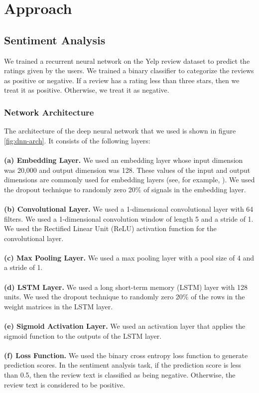 \section{Approach}

\subsection{Sentiment Analysis}

We trained a recurrent neural network on the Yelp review dataset to predict the ratings given by the users. We trained a binary classifier to categorize the reviews as positive or negative. If a review has a rating less than three stars, then we treat it as positive. Otherwise, we treat it as negative.

\subsubsection{Network Architecture}

The architecture of the deep neural network that we used is shown in figure \ref{fig:dnn-arch}. It consists of the following layers:
\\ \\
\textbf{(a) Embedding Layer.} We used an embedding layer whose input dimension was 20,000 and output dimension was 128. These values of the input and output dimensions are commonly used for embedding layers (see, for example, \cite{Lu2017}). We used the dropout technique \cite{ZarembaSV2014} to randomly zero 20\% of signals in the embedding layer.
\\ \\
\textbf{(b) Convolutional Layer.} We used a 1-dimensional convolutional layer with 64 filters. We used a 1-dimensional convolution window of length 5 and a stride of 1. We used the Rectified Linear Unit (ReLU) activation function for the convolutional layer.
\\ \\
\textbf{(c) Max Pooling Layer.} We used a max pooling layer with a pool size of 4 and a stride of 1.
\\ \\
\textbf{(d) LSTM Layer.} We used a long short-term memory (LSTM) layer with 128 units. We used the dropout technique \cite{ZarembaSV2014} to randomly zero 20\% of the rows in the weight matrices in the LSTM layer.
\\ \\
\textbf{(e) Sigmoid Activation Layer.} We used an activation layer that applies the sigmoid function to the outputs of the LSTM layer.
\\ \\
\textbf{(f) Loss Function.} We used the binary cross entropy loss function to generate prediction scores. In the sentiment analysis task, if the prediction score is less than 0.5, then the review text is classified as being negative. Otherwise, the review text is considered to be positive.

